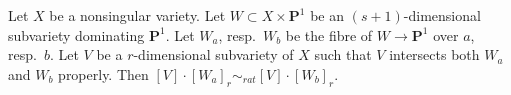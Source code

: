 %
\begin{lemma}
\label{lemma-well-defined-special-case}
Let $X$ be a nonsingular variety. Let
$W \subset X \times \mathbf{P}^1$ be an $(s + 1)$-dimensional subvariety
dominating $\mathbf{P}^1$. Let $W_a$, resp.\ $W_b$ be the fibre of
$W \to \mathbf{P}^1$ over $a$, resp.\ $b$. Let $V$ be a $r$-dimensional
subvariety of $X$ such that $V$ intersects both $W_a$ and
$W_b$ properly. Then $[V] \cdot [W_a]_r \sim_{rat} [V] \cdot [W_b]_r$.
\end{lemma}

